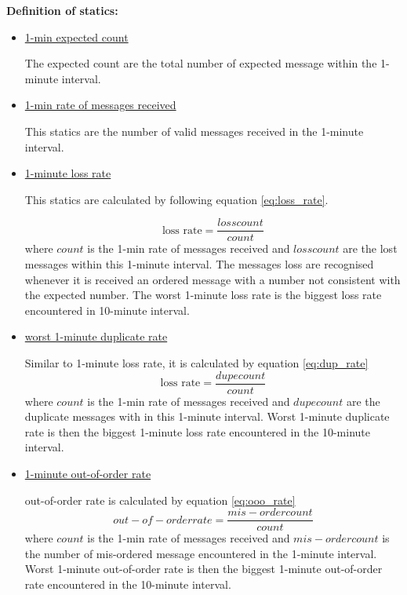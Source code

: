 \documentclass[12pt, letterpaper]{article}
\begin{document}
\textbf{Definition of statics:}
\begin{itemize}
	\item \underline{1-min expected count}
	
	The expected count are the total number of expected message within the 1-minute interval.
	
	\item \underline{1-min rate of messages received}
	
	This statics are the number of valid messages received in the 1-minute interval.
	
	\item \underline{1-minute loss rate}
	
	This statics are calculated by following equation \ref{eq:loss_rate}.
	
	\begin{equation} \label{eq:loss_rate}
		\text{loss rate} = \frac {loss count} {count}
	\end{equation}
	where $count$ is the 1-min rate of messages received and $loss count$ are the lost messages within this 1-minute interval. The messages loss are recognised whenever it is received an ordered message with a number not consistent with the expected number.
	The worst 1-minute loss rate is the biggest loss rate encountered in 10-minute interval.
	
	\item \underline{worst 1-minute duplicate rate}
	
	Similar to 1-minute loss rate, it is calculated by equation \ref{eq:dup_rate}
	\begin{equation} \label{eq:dup_rate}
		\text{loss rate} = \frac {dupe count} {count}
	\end{equation}
	where $count$ is the 1-min rate of messages received and $dupe count$ are the duplicate messages with in this 1-minute interval. Worst 1-minute duplicate rate is then the biggest 1-minute loss rate encountered in the 10-minute interval.
	
	\item \underline{1-minute out-of-order rate}
	
	out-of-order rate is calculated by equation \ref{eq:ooo_rate}
	\begin{equation} \label{eq:ooo_rate}
		out-of-order rate = \frac{mis-order count} {count}
	\end{equation}
	where $count$ is the 1-min rate of messages received and $mis-order count$ is the number of mis-ordered message encountered in the 1-minute interval. Worst 1-minute out-of-order rate is then the biggest 1-minute out-of-order rate encountered in the 10-minute interval.	
	
\end{itemize}
\end{document}
